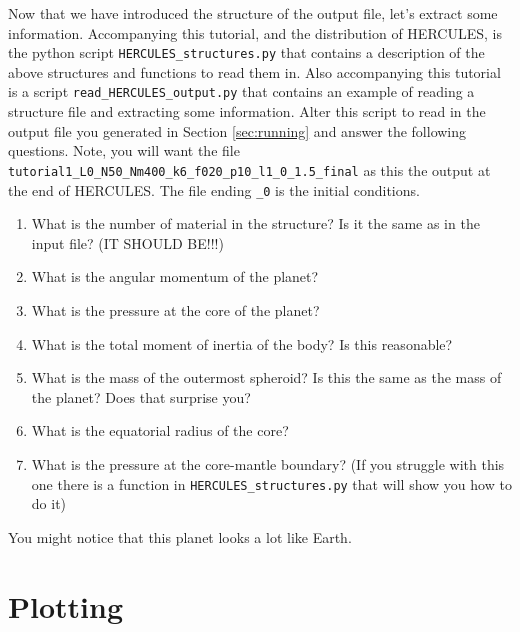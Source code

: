 \documentclass[11pt, oneside]{article}   	%
\begin{document}
Now that we have introduced the structure of the output file, let's extract some information. Accompanying this tutorial, and the distribution of HERCULES, is the python script \texttt{HERCULES\_structures.py} that contains a description of the above structures and functions to read them in. Also accompanying this tutorial is a script \texttt{read\_HERCULES\_output.py} that contains an example of reading a structure file and extracting some information. Alter this script to read in the output file you generated in Section \ref{sec:running} and answer the following questions. Note, you will want the file \texttt{tutorial1\_L0\_N50\_Nm400\_k6\_f020\_p10\_l1\_0\_1.5\_final} as this the output at the end of HERCULES. The file ending \texttt{\_0} is the initial conditions.

\begin{enumerate}

\item What is the number of material in the structure? Is it the same as in the input file? (IT SHOULD BE!!!)

\item What is the angular momentum of the planet?

\item What is the pressure at the core of the planet?

\item What is the total moment of inertia of the body? Is this reasonable?

\item What is the mass of the outermost spheroid? Is this the same as the mass of the planet? Does that surprise you?

\item What is the equatorial radius of the core?

\item What is the pressure at the core-mantle boundary? (If you struggle with this one there is a function in \texttt{HERCULES\_structures.py} that will show you how to do it)

\end{enumerate}

You might notice that this planet looks a lot like Earth.

\section{Plotting}
\end{document}
